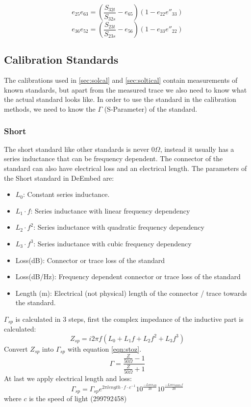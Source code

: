 \begin{equation}
\label{eqn:e25e63_3p}
e_{25}e_{63} = \left(\frac{S_{32t}}{S_{32s}} - e_{65}\right)\left(1-e_{22}e''_{33}\right)
\end{equation}
\begin{equation}
\label{eqn:e36e52_3p}
e_{36}e_{52} = \left(\frac{S_{23t}}{S_{23s}} - e_{56}\right)\left(1-e_{33}e''_{22}\right)
\end{equation}



\subsection{Calibration Standards}
\label{sec:calstds}

The calibrations used in \ref{sec:solcal} and \ref{sec:soltical} contain measurements of known standards, but apart from the measured trace we also need to know what the actual standard looks like. In order to use the standard in the calibration methods, we need to know the $\Gamma$ (S-Parameter) of the standard.
\subsubsection{Short}
\label{sec:shortstd}
The short standard like other standards is never $0\Omega$, instead it usually has a series inductance that can be frequency dependent. The connector of the standard can also have electrical loss and an electrical length. The parameters of the Short standard in DeEmbed are:
\begin{itemize}
	\item $L_0$: Constant series inductance.
	\item $L_1 \cdot f$: Series inductance with linear frequency dependency
	\item $L_2 \cdot f^2$: Series inductance with quadratic frequency dependency
	\item $L_3 \cdot f^3$: Series inductance with cubic frequency dependency
	\item Loss(dB): Connector or trace loss of the standard
	\item Loss(dB/Hz): Frequency dependent connector or trace loss of the standard
	\item Length (m): Electrical (not physical) length of the connector / trace towards the standard.
\end{itemize}
$\Gamma_{sp}$ is calculated in 3 steps, first the complex impedance of the inductive part is calculated:
\begin{equation}
Z_{sp} = i 2 \pi f (L_0 + L_1 f + L_2 f^2 + L_3 f^3)
\end{equation}
Convert $Z_{sp}$ into $\Gamma_{sp}$ with equation \ref{eqn:stoz}.
\begin{equation}
\label{eqn:stoz}
\Gamma=\frac{\frac{Z}{50\Omega}-1}{\frac{Z}{50\Omega}+1}
\end{equation}
At last we apply electrical length and loss:
\begin{equation}
\Gamma_{sp} = \Gamma_{sp} e^{2 \pi length\cdot f\cdot c^{-1}} 10^{\frac{-Loss_{dB}}{20}} 10^{\frac{-Loss_{dBHz} f }{20}}
\end{equation}
where $c$ is the speed of light (299792458)


